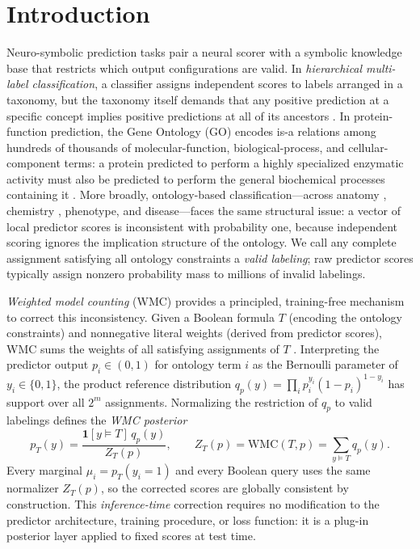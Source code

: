 \documentclass[12pt]{article}
\begin{document}
\section{Introduction}
\label{sec:intro}

Neuro-symbolic prediction tasks pair a neural scorer with a symbolic
knowledge base that restricts which output configurations are valid.
In \emph{hierarchical multi-label classification}, a classifier assigns
independent scores to labels arranged in a taxonomy, but the taxonomy
itself demands that any positive prediction at a specific concept
implies positive predictions at all of its ancestors
\citep{silla2011survey}. In protein-function prediction, the Gene
Ontology (GO) encodes is-a relations among hundreds of thousands of
molecular-function, biological-process, and cellular-component terms:
a protein predicted to perform a highly specialized enzymatic activity
must also be predicted to perform the general biochemical processes
containing it \citep{ashburner2000go,geneontology2023}. More broadly,
ontology-based classification---across anatomy \citep{mungall2012uberon},
chemistry \citep{hastings2016chebi}, phenotype, and disease---faces the
same structural issue: a vector of local predictor scores is inconsistent
with probability one, because independent scoring ignores the implication
structure of the ontology. We call any complete assignment satisfying all
ontology constraints a \emph{valid labeling}; raw predictor scores
typically assign nonzero probability mass to millions of invalid
labelings.

\emph{Weighted model counting} (WMC) provides a principled,
training-free mechanism to correct this inconsistency. Given a Boolean
formula $T$ (encoding the ontology constraints) and nonnegative literal
weights (derived from predictor scores), WMC sums the weights of all
satisfying assignments of $T$ \citep{chavira2008wmc}. Interpreting the
predictor output $p_i \in (0,1)$ for ontology term $i$ as the Bernoulli
parameter of $y_i \in \{0,1\}$, the product reference distribution
$q_p(y) = \prod_i p_i^{y_i}(1-p_i)^{1-y_i}$ has support over all
$2^m$ assignments. Normalizing the restriction of $q_p$ to valid
labelings defines the \emph{WMC posterior}
\[
  p_T(y) = \frac{\mathbf{1}[y \models T]\,q_p(y)}{Z_T(p)},
  \qquad
  Z_T(p) = \mathrm{WMC}(T,p) = \sum_{y \models T} q_p(y).
\]
Every marginal $\mu_i = p_T(y_i=1)$ and every Boolean query uses the
same normalizer $Z_T(p)$, so the corrected scores are globally
consistent by construction. This \emph{inference-time} correction
requires no modification to the predictor architecture, training
procedure, or loss function: it is a plug-in posterior layer applied
to fixed scores at test time.
\end{document}
